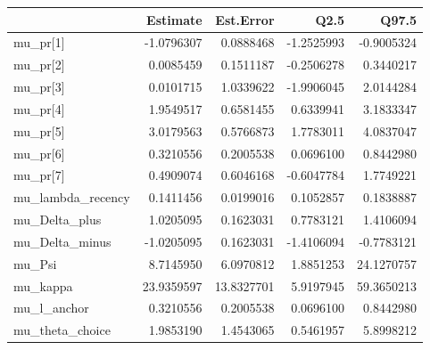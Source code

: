 
\begin{tabular}{lrrrr}
\toprule
  & Estimate & Est.Error & Q2.5 & Q97.5\\
\midrule
mu\_pr[1] & -1.0796307 & 0.0888468 & -1.2525993 & -0.9005324\\
mu\_pr[2] & 0.0085459 & 0.1511187 & -0.2506278 & 0.3440217\\
mu\_pr[3] & 0.0101715 & 1.0339622 & -1.9906045 & 2.0144284\\
mu\_pr[4] & 1.9549517 & 0.6581455 & 0.6339941 & 3.1833347\\
mu\_pr[5] & 3.0179563 & 0.5766873 & 1.7783011 & 4.0837047\\
\addlinespace
mu\_pr[6] & 0.3210556 & 0.2005538 & 0.0696100 & 0.8442980\\
mu\_pr[7] & 0.4909074 & 0.6046168 & -0.6047784 & 1.7749221\\
mu\_lambda\_recency & 0.1411456 & 0.0199016 & 0.1052857 & 0.1838887\\
mu\_Delta\_plus & 1.0205095 & 0.1623031 & 0.7783121 & 1.4106094\\
mu\_Delta\_minus & -1.0205095 & 0.1623031 & -1.4106094 & -0.7783121\\
\addlinespace
mu\_Psi & 8.7145950 & 6.0970812 & 1.8851253 & 24.1270757\\
mu\_kappa & 23.9359597 & 13.8327701 & 5.9197945 & 59.3650213\\
mu\_l\_anchor & 0.3210556 & 0.2005538 & 0.0696100 & 0.8442980\\
mu\_theta\_choice & 1.9853190 & 1.4543065 & 0.5461957 & 5.8998212\\
\bottomrule
\end{tabular}
